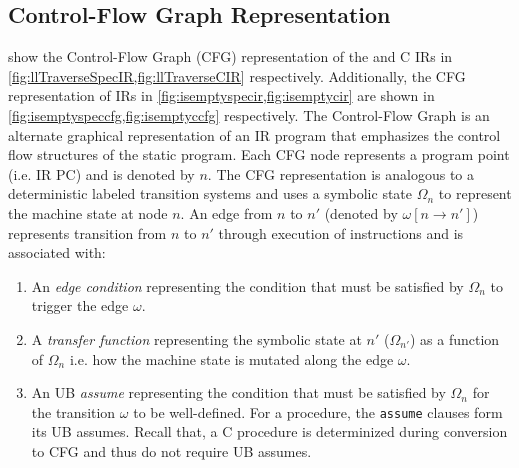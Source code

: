 \subsection{Control-Flow Graph Representation}
\label{sec:cfg}
 show the Control-Flow Graph (CFG) representation
of the \SpecL{} and C IRs in \cref{fig:llTraverseSpecIR,fig:llTraverseCIR} respectively.
Additionally, the CFG representation of IRs in \cref{fig:isemptyspecir,fig:isemptycir} are
shown in \cref{fig:isemptyspeccfg,fig:isemptyccfg} respectively.
The Control-Flow Graph is an alternate graphical representation of an IR program that emphasizes
the control flow structures of the static program.
Each CFG node represents a program point (i.e. IR PC) and is denoted by $n$.
The CFG representation is analogous to a deterministic labeled transition systems and
uses a symbolic state $\Omega_n$ to represent the machine state at node $n$.
An edge from $n$ to $n'$ (denoted by $\omega[n \rightarrow n']$) represents transition
from $n$ to $n'$ through execution of instructions and is associated with:

\begin{enumerate}
\item An {\em edge condition} representing the condition that must be satisfied by $\Omega_n$
to trigger the edge $\omega$.
\item A {\em transfer function} representing the symbolic state at $n'$ ($\Omega_{n'}$) as a function of $\Omega_n$
i.e. how the machine state is mutated along the edge $\omega$.
\item An UB {\em assume} representing the condition that must be satisfied by $\Omega_n$ for
the transition $\omega$ to be well-defined.
For a \SpecL{} procedure, the {\tt assume} clauses form its UB assumes.
Recall that, a C procedure is determinized during conversion to CFG and thus do not require UB assumes.
\end{enumerate}

